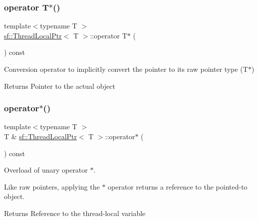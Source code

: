\subsubsection{\texorpdfstring{operator T$\ast$()}{operator T*()}}
{\footnotesize\ttfamily template$<$typename T $>$ \\
\mbox{\hyperlink{classsf_1_1_thread_local_ptr}{sf\+::\+Thread\+Local\+Ptr}}$<$ T $>$\+::operator T$\ast$ (\begin{DoxyParamCaption}{ }\end{DoxyParamCaption}) const}



Conversion operator to implicitly convert the pointer to its raw pointer type (T$\ast$) 

\begin{DoxyReturn}{Returns}
Pointer to the actual object \begin{DoxyVerb}\end{DoxyVerb}
 
\end{DoxyReturn}
\mbox{\label{classsf_1_1_thread_local_ptr_adcbb45ae077df714bf9c61e936d97770}} 
\subsubsection{\texorpdfstring{operator$\ast$()}{operator*()}}
{\footnotesize\ttfamily template$<$typename T $>$ \\
T \& \mbox{\hyperlink{classsf_1_1_thread_local_ptr}{sf\+::\+Thread\+Local\+Ptr}}$<$ T $>$\+::operator$\ast$ (\begin{DoxyParamCaption}{ }\end{DoxyParamCaption}) const}



Overload of unary operator $\ast$. 

Like raw pointers, applying the $\ast$ operator returns a reference to the pointed-\/to object.

\begin{DoxyReturn}{Returns}
Reference to the thread-\/local variable \begin{DoxyVerb}\end{DoxyVerb}
 
\end{DoxyReturn}
\mbox{\label{classsf_1_1_thread_local_ptr_a25646e1014a933d1a45b9ce17bab7703}} 
